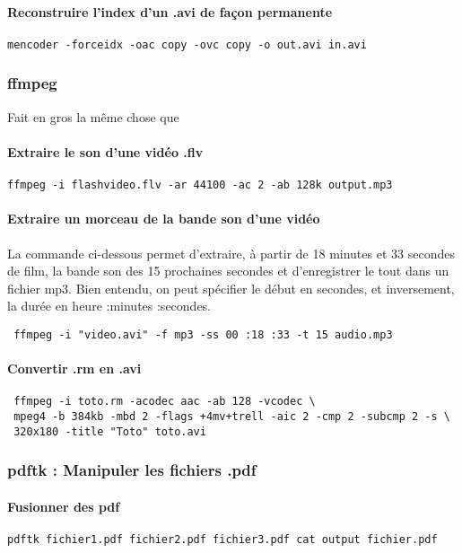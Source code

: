 \documentclass[a4paper,twoside]{article}
\begin{document}
\paragraph{Reconstruire l'index d'un .avi de façon permanente}
\begin{verbatim}
mencoder -forceidx -oac copy -ovc copy -o out.avi in.avi
\end{verbatim}

\subsubsection{ffmpeg}
Fait en gros la même chose que 
\paragraph{Extraire le son d'une vidéo .flv}
\begin{verbatim}
ffmpeg -i flashvideo.flv -ar 44100 -ac 2 -ab 128k output.mp3
\end{verbatim}

\paragraph{Extraire un morceau de la bande son d'une vidéo}
La commande ci-dessous permet d'extraire, à partir de 18 minutes et 33 secondes de film, la bande son des 15 prochaines secondes et d'enregistrer le tout dans un fichier mp3. Bien entendu, on peut spécifier le début en secondes, et inversement, la durée en heure :minutes :secondes.\par

\verb| ffmpeg -i "video.avi" -f mp3 -ss 00 :18 :33 -t 15 audio.mp3|
\paragraph{Convertir .rm en .avi}
\begin{verbatim}
 ffmpeg -i toto.rm -acodec aac -ab 128 -vcodec \
 mpeg4 -b 384kb -mbd 2 -flags +4mv+trell -aic 2 -cmp 2 -subcmp 2 -s \
 320x180 -title "Toto" toto.avi
\end{verbatim}

\subsubsection{pdftk : Manipuler les fichiers .pdf}
\paragraph{Fusionner des pdf}
\begin{verbatim}
pdftk fichier1.pdf fichier2.pdf fichier3.pdf cat output fichier.pdf
\end{verbatim}
\end{document}
